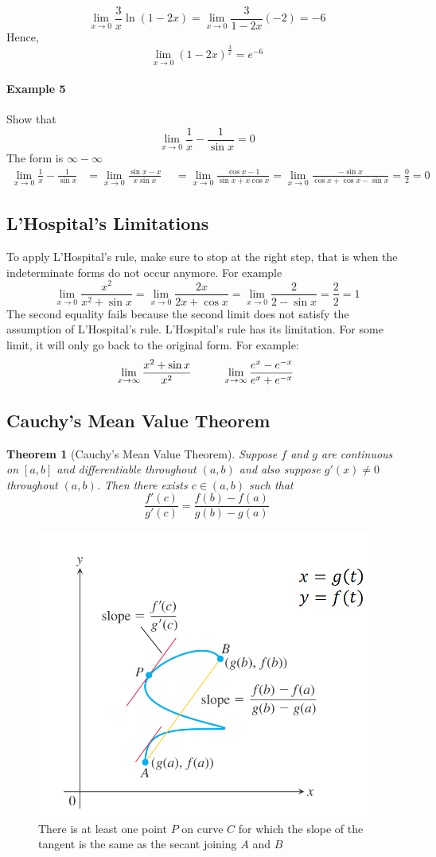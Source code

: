 \documentclass[12pt]{article}
\newcommand\tab[1][1cm]{\hspace*{#1}}
\newtheorem{theorem}{Theorem}
\begin{document}
\[
    \lim_{x \to 0} \frac{3}{x} \ln(1 - 2x) = \lim_{x \to 0} \frac{3}{1 - 2x} ( - 2) = - 6
\]
Hence,
\[
    \lim_{x \to 0} (1 - 2x)^{\frac{3}{x}} = e^{- 6}
\]

\paragraph{Example 5} Show that
\[
    \lim_{x \to 0} \frac{1}{x} - \frac{1}{\sin x} = 0
\]
The form is $\infty - \infty$
\begin{align*} 
    \lim_{x \to 0} \frac{1}{x} - \frac{1}{\sin x} &= \lim_{x \to 0} \frac{\sin x - x}{x \sin x}\, \
    &= \lim_{x \to 0} \frac{\cos x - 1}{\sin x + x \cos x} = \lim_{x \to 0} \frac{ - \sin x}{\cos x + \cos x - \sin x} = \frac{0}{2} = 0
\end{align*}

\subsection{L'Hospital's Limitations}
To apply L'Hospital's rule, make sure to stop at the right step, that is when the indeterminate forms do not occur anymore.
For example
\[
    \lim_{x \to 0} \frac{x^2}{x^2 + \sin x} = \lim_{x \to 0} \frac{2x}{2x + \cos x} = \lim_{x \to 0} \frac{2}{2 - \sin x} = \frac{2}{2} = 1 
\]
The second equality fails because the second limit does not satisfy the assumption of L'Hospital's rule.
\noindent
L'Hospital's rule has its limitation. For some limit, it will only go back to the original form. For example:
\[
    \lim_{x \to \infty} \frac{x^2 + \sin x}{x^2} \textrm{\tab} \lim_{x \to \infty} \frac{e^x - e^{-x}}{e^x + e^{-x}}\, 
\]
\subsection{Cauchy's Mean Value Theorem}
\begin{theorem}[Cauchy's Mean Value Theorem]
     Suppose $f$ and $g$ are continuous on $[a, b]$ and differentiable throughout $(a, b)$ and also suppose $g'(x) \neq 0$ throughout $(a, b)$. Then there exists $c \in (a, b)$ such that
     \[
         \frac{f'(c)}{g'(c)} = \frac{f(b) - f(a)}{g(b) - g(a)} 
     \]
\end{theorem}

\begin{figure}[H]
     \centering
     \includegraphics[width = 0.5\linewidth]{Images/cauchys MVT.png}
     \caption{There is at least one point $P$ on curve $C$ for which the slope of the tangent is the same as the secant joining $A$ and $B$}
\end{figure}
\end{document}
